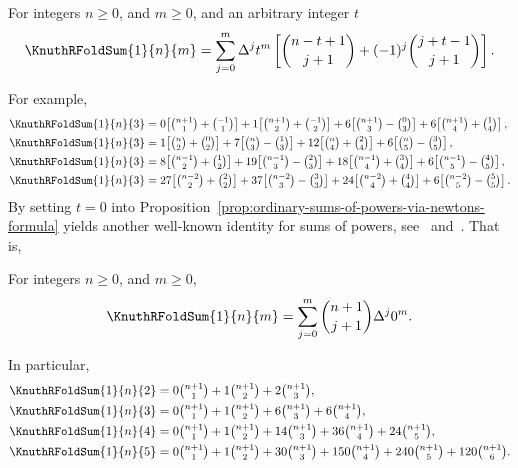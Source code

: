 \begin{proposition}
  \label{prop:negation-of-ordinary-sums-of-powers-via-newtons-formula}
  For integers $n\geq 0$, and $m\geq 0$, and an arbitrary integer $t$
  \begin{align*}
    \KnuthRFoldSum{1}{n}{m} = \sum_{j=0}^{m} \Delta^{j} t^m
    \left[ \binom{n-t+1}{j+1} + (-1)^j \binom{j+t-1}{j+1} \right].
  \end{align*}
\end{proposition}
For example,
\begin{align*}
  \KnuthRFoldSum{1}{n}{3}
  &= 0\!\left[\tbinom{n+1}{1} + \tbinom{-1}{1}\right]
  +  1\!\left[\tbinom{n+1}{2} + \tbinom{-1}{2}\right]
  +  6\!\left[\tbinom{n+1}{3} - \tbinom{0}{3}\right]
  +  6\!\left[\tbinom{n+1}{4} + \tbinom{1}{4}\right], \\
  \KnuthRFoldSum{1}{n}{3}
  &= 1\!\left[\tbinom{n}{2} + \tbinom{0}{2}\right]
  + 7\!\left[\tbinom{n}{3} - \tbinom{1}{3}\right]
  + 12\!\left[\tbinom{n}{4} + \tbinom{2}{4}\right]
  + 6\!\left[\tbinom{n}{5} - \tbinom{3}{5}\right], \\
  \KnuthRFoldSum{1}{n}{3}
  &= 8\!\left[\tbinom{n-1}{2} + \tbinom{1}{2}\right]
  + 19\!\left[\tbinom{n-1}{3} - \tbinom{2}{3}\right]
  + 18\!\left[\tbinom{n-1}{4} + \tbinom{3}{4}\right]
  + 6\!\left[\tbinom{n-1}{5} - \tbinom{4}{5}\right], \\
  \KnuthRFoldSum{1}{n}{3}
  &= 27\!\left[\tbinom{n-2}{2} + \tbinom{2}{2}\right]
  + 37\!\left[\tbinom{n-2}{3} - \tbinom{3}{3}\right]
  + 24\!\left[\tbinom{n-2}{4} + \tbinom{4}{4}\right]
  + 6\!\left[\tbinom{n-2}{5} - \tbinom{5}{5}\right].
\end{align*}
By setting $t=0$ into
Proposition~\eqref{prop:ordinary-sums-of-powers-via-newtons-formula}
yields another well-known identity for sums of powers,
see~\cite[p. 190]{graham1994concrete} and~\cite{pfaff2007deriving}.
That is,
\begin{corollary}
  For integers $n \geq 0$, and $m \geq 0$,
  \begin{align*}
    \KnuthRFoldSum{1}{n}{m} = \sum_{j=0}^{m} \binom{n+1}{j+1} \Delta^{j} 0^m.
  \end{align*}
\end{corollary}
In particular,
\begin{align*}
  \KnuthRFoldSum{1}{n}{2} &= 0 \tbinom{n+1}{1} + 1 \tbinom{n+1}{2}
  + 2  \tbinom{n+1}{3},
  \\
  \KnuthRFoldSum{1}{n}{3} &= 0 \tbinom{n+1}{1} + 1 \tbinom{n+1}{2}
  + 6  \tbinom{n+1}{3} + 6   \tbinom{n+1}{4},
  \\
  \KnuthRFoldSum{1}{n}{4} &= 0 \tbinom{n+1}{1} + 1 \tbinom{n+1}{2}
  + 14 \tbinom{n+1}{3} + 36  \tbinom{n+1}{4} + 24  \tbinom{n+1}{5},
  \\
  \KnuthRFoldSum{1}{n}{5} &= 0 \tbinom{n+1}{1} + 1 \tbinom{n+1}{2}
  + 30 \tbinom{n+1}{3} + 150 \tbinom{n+1}{4} + 240 \tbinom{n+1}{5}
  + 120 \tbinom{n+1}{6}.
\end{align*}
